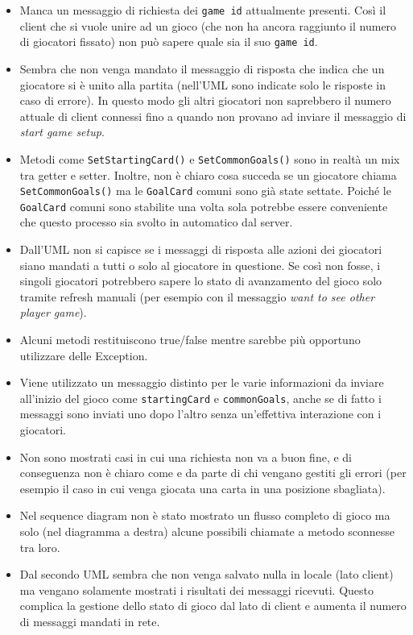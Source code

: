 \documentclass[12pt]{article}
\begin{document}
\begin{itemize}

    \item Manca un messaggio di richiesta dei \texttt{game id} attualmente presenti. Così il client che si vuole unire ad un gioco (che non ha ancora raggiunto il numero di giocatori fissato) non può sapere quale sia il suo \texttt{game id}.

    \item Sembra che non venga mandato il messaggio di risposta che indica che un giocatore si è unito alla partita (nell'UML sono indicate solo le risposte in caso di errore).
    In questo modo gli altri giocatori non saprebbero il numero attuale di client connessi fino a quando non provano ad inviare il messaggio di \textit{start game setup}.

    \item Metodi come \texttt{SetStartingCard()} e \texttt{SetCommonGoals()} sono in realtà un mix tra getter e setter. Inoltre, non è chiaro cosa succeda se un giocatore chiama \texttt{SetCommonGoals()} ma le \texttt{GoalCard} comuni sono già state settate. Poiché le \texttt{GoalCard} comuni sono stabilite una volta sola potrebbe essere conveniente che questo processo sia svolto in automatico dal server.

    \item Dall'UML non si capisce se i messaggi di risposta alle azioni dei giocatori siano mandati a tutti o solo al giocatore in questione. Se così non fosse, i singoli giocatori potrebbero sapere lo stato di avanzamento del gioco solo tramite refresh manuali (per esempio con il messaggio \textit{want to see other player game}).

    \item Alcuni metodi restituiscono true/false mentre sarebbe più opportuno utilizzare delle Exception.

    \item Viene utilizzato un messaggio distinto per le varie informazioni da inviare all'inizio del gioco come \texttt{startingCard} e \texttt{commonGoals}, anche se di fatto i messaggi sono inviati uno dopo l'altro senza un'effettiva interazione con i giocatori.

    \item Non sono mostrati casi in cui una richiesta non va a buon fine, e di conseguenza non è chiaro come e da parte di chi vengano gestiti gli errori (per esempio il caso in cui venga giocata una carta in una posizione sbagliata).

    \item Nel sequence diagram non è stato mostrato un flusso completo di gioco ma solo (nel diagramma a destra) alcune possibili chiamate a metodo sconnesse tra loro.

    \item Dal secondo UML sembra che non venga salvato nulla in locale (lato client) ma vengano solamente mostrati i risultati dei messaggi ricevuti. Questo complica la gestione dello stato di gioco dal lato di client e aumenta il numero di messaggi mandati in rete.

\end{itemize}
\end{document}
